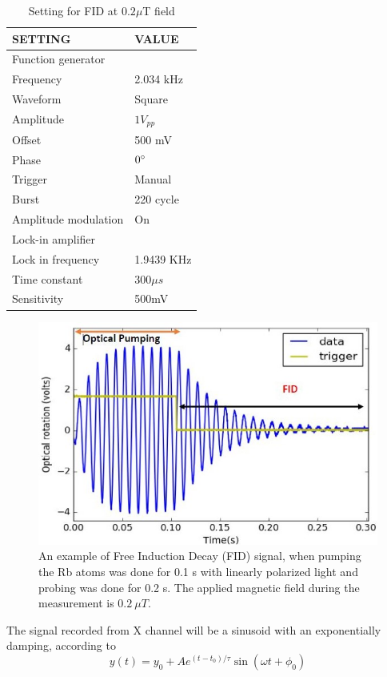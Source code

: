 \begin{table}[h]
\centering
\begin{tabular}{|l |l|}
\hline

\textbf{ SETTING}    & \textbf{VALUE} \\
\hline
Function generator &   \\
\hline
Frequency & 2.034 kHz   \\

Waveform    &  Square  \\

Amplitude   &  $1V_{pp}$  \\
Offset  &       500 mV  \\
Phase       &    $0\degree$ \\
Trigger     &   Manual  \\
Burst       &    220 cycle \\
Amplitude modulation & On \\
\hline
Lock-in amplifier &     \\
\hline
Lock in frequency     & 1.9439 KHz \\
Time constant     &  $300\mu s$ \\
Sensitivity      &  500mV  \\
\hline
\end{tabular}
\caption{Setting for FID at $0.2 \mu$T field\label{table:FID setting}}
\end{table}
\begin{figure}[h]
\centering\includegraphics[width=0.55\linewidth]{figures/Capture2}
\caption{ An example of Free Induction Decay (FID) signal, when pumping the Rb atoms  was done for 0.1 s with linearly polarized light and probing was done for 0.2 s. The applied magnetic field during the measurement is $0.2~\mu T$. \label{fig:FID example}}
\end{figure}
The signal recorded  from X channel will be a sinusoid with an exponentially damping, according to   
  \begin{equation}
 y(t) = y_0 + A   e^{(t-t_0)/\tau}\sin(\omega t + \phi_0)\label{eq:decaying sinwave}
\end{equation}  

